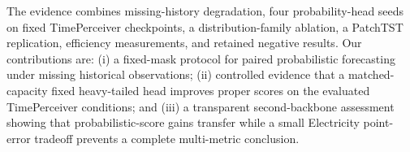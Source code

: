 The evidence combines missing-history degradation, four probability-head seeds on fixed TimePerceiver checkpoints, a distribution-family ablation, a PatchTST replication, efficiency measurements, and retained negative results. Our contributions are: (i) a fixed-mask protocol for paired probabilistic forecasting under missing historical observations; (ii) controlled evidence that a matched-capacity fixed heavy-tailed head improves proper scores on the evaluated TimePerceiver conditions; and (iii) a transparent second-backbone assessment showing that probabilistic-score gains transfer while a small Electricity point-error tradeoff prevents a complete multi-metric conclusion.
